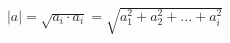 \documentclass[preview]{standalone}
\begin{document}
\begin{align*}
| a | = \sqrt{a_i \cdot a_i} = \sqrt{a^2_1 + a^2_2 + ... + a^2_i}
\end{align*}
\end{document}
